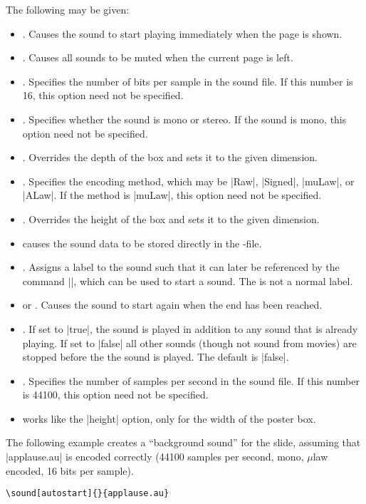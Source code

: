 \begin{command}{\sound{}}
  The following  may be given:
  \begin{itemize}
  \item
    . Causes the sound to start playing immediately
    when the page is shown.
  \item
    . Causes all sounds to be muted when the current
    page is left.
  \item
    . Specifies the number of
    bits per sample in the sound file. If this number is 16, this
    option need not be specified.
  \item
    . Specifies whether the sound is
    mono or stereo. If the sound is mono, this option need not be specified.
  \item
    . Overrides the depth of the
     box and sets it to the given dimension.
  \item
    . Specifies the encoding method,
    which may be |Raw|, |Signed|, |muLaw|, or |ALaw|. If the method is
    |muLaw|, this option need not be specified.
  \item
    . Overrides the height of the
     box and sets it to the given dimension.
  \item
     causes the sound data to be stored directly
    in the \pdf-file.
  \item
    . Assigns a label to the sound
    such that it can later be referenced by the command
    |\hyperlinksound|, which can be used to start a sound. The
     is not a normal label.
  \item
     or . Causes the sound to start
    again when the end has been reached.
  \item
    . If set to |true|, the
    sound is played in addition to any sound that is already
    playing. If set to |false| all other sounds (though not sound from
    movies) are stopped before the the sound is played. The default is
    |false|.
  \item
    . Specifies the number of
    samples per second in the sound file. If this number is 44100,
    this option need not be specified.
  \item
     works like the |height|
    option, only for the width of the poster box.
  \end{itemize}

  \example The following example creates a ``background sound'' for
  the slide, assuming that |applause.au| is encoded correctly (44100
  samples per second, mono, $\mu$law encoded, 16 bits per sample).
\begin{verbatim}
\sound[autostart]{}{applause.au}
\end{verbatim}
\end{command}

